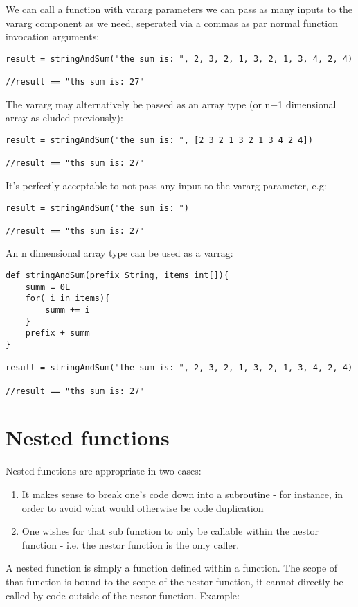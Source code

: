 \documentclass[conc-doc]{subfiles}
\begin{document}
We can call a function with vararg parameters we can pass as many inputs to the vararg component as we need, seperated via a commas as par normal function invocation arguments:
\begin{lstlisting}
result = stringAndSum("the sum is: ", 2, 3, 2, 1, 3, 2, 1, 3, 4, 2, 4)

//result == "ths sum is: 27"
\end{lstlisting}

The vararg may alternatively be passed as an array type (or n+1 dimensional array as eluded previously):
\begin{lstlisting}
result = stringAndSum("the sum is: ", [2 3 2 1 3 2 1 3 4 2 4])

//result == "ths sum is: 27"
\end{lstlisting}

It's perfectly acceptable to not pass any input to the vararg parameter, e.g:

\begin{lstlisting}
result = stringAndSum("the sum is: ")

//result == "ths sum is: 27"
\end{lstlisting}

An n dimensional array type can be used as a varrag:
\begin{lstlisting}
def stringAndSum(prefix String, items int[]){
	summ = 0L
	for( i in items){
		summ += i
	}
	prefix + summ
}

result = stringAndSum("the sum is: ", 2, 3, 2, 1, 3, 2, 1, 3, 4, 2, 4)

//result == "ths sum is: 27"
\end{lstlisting}

\section{Nested functions}
Nested functions are appropriate in two cases:

\begin{enumerate}
	\item It makes sense to break one's code down into a subroutine - for instance, in order to avoid what would otherwise be code duplication
	\item One wishes for that sub function to only be callable within the nestor function - i.e. the nestor function is the only caller.
\end{enumerate}




A nested function is simply a function defined within a function. The scope of that function is bound to the scope of the nestor function, it cannot directly be called by code outside of the nestor function. Example:
\end{document}
